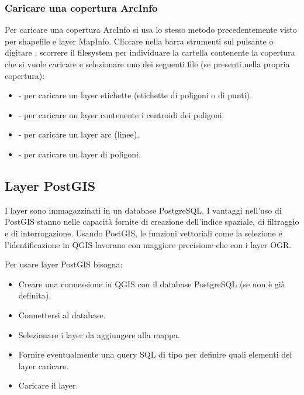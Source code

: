 \subsubsection{Caricare una copertura ArcInfo}

Per caricare una copertura ArcInfo si usa lo stesso metodo precedentemente visto
per shapefile e layer MapInfo. 
Cliccare nella barra strumenti sul pulsante
 o digitare
, scorrere il filesystem per individuare la cartella contenente
la copertura che si vuole caricare e selezionare uno dei seguenti file (se
presenti nella propria copertura):

\begin{itemize}
\item {} - per caricare un layer etichette (etichette di poligoni o di punti).
\item {} - per caricare un layer contenente i centroidi dei poligoni 
\item {} - per caricare un layer arc (linee).
\item {} - per caricare un layer di poligoni.
\end{itemize}

\subsection{Layer PostGIS}
\label{label_postgis} 

I layer sono immagazzinati in un database PostgreSQL. I vantaggi
nell'uso di PostGIS stanno nelle capacità fornite di creazione dell'indice spaziale,
di filtraggio e di interrogazione. Usando PostGIS, le funzioni
vettoriali come la selezione e l'identificazione in QGIS lavorano con maggiore
precisione che con i layer OGR.

Per usare layer PostGIS bisogna:

\begin{itemize}
\item Creare una connessione in QGIS con il database PostgreSQL (se non è già
definita).
\item Connettersi al database.
\item Selezionare i layer da aggiungere alla mappa.
\item Fornire eventualmente una query SQL di tipo  per
definire quali elementi del layer caricare.
\item Caricare il layer.
\end{itemize}

